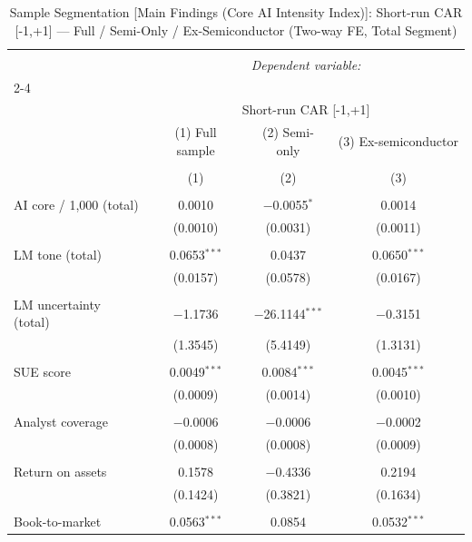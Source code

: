 
\begin{table}[!htbp] \centering 
  \caption{Sample Segmentation [Main Findings (Core AI Intensity Index)]: Short-run CAR [-1,+1] — Full / Semi-Only / Ex-Semiconductor (Two-way FE, Total Segment)} 
  \label{} 
\begin{tabular}{@{\extracolsep{5pt}}lccc} 
\\[-1.8ex]\hline 
\hline \\[-1.8ex] 
 & \multicolumn{3}{c}{\textit{Dependent variable:}} \\ 
\cline{2-4} 
\\[-1.8ex] & \multicolumn{3}{c}{Short-run CAR [-1,+1]} \\ 
 & (1) Full sample & (2) Semi-only & (3) Ex-semiconductor \\ 
\\[-1.8ex] & (1) & (2) & (3)\\ 
\hline \\[-1.8ex] 
 AI core / 1,000 (total) & 0.0010 & $-$0.0055$^{*}$ & 0.0014 \\ 
  & (0.0010) & (0.0031) & (0.0011) \\ 
  & & & \\ 
 LM tone (total) & 0.0653$^{***}$ & 0.0437 & 0.0650$^{***}$ \\ 
  & (0.0157) & (0.0578) & (0.0167) \\ 
  & & & \\ 
 LM uncertainty (total) & $-$1.1736 & $-$26.1144$^{***}$ & $-$0.3151 \\ 
  & (1.3545) & (5.4149) & (1.3131) \\ 
  & & & \\ 
 SUE score & 0.0049$^{***}$ & 0.0084$^{***}$ & 0.0045$^{***}$ \\ 
  & (0.0009) & (0.0014) & (0.0010) \\ 
  & & & \\ 
 Analyst coverage & $-$0.0006 & $-$0.0006 & $-$0.0002 \\ 
  & (0.0008) & (0.0008) & (0.0009) \\ 
  & & & \\ 
 Return on assets & 0.1578 & $-$0.4336 & 0.2194 \\ 
  & (0.1424) & (0.3821) & (0.1634) \\ 
  & & & \\ 
 Book-to-market & 0.0563$^{***}$ & 0.0854 & 0.0532$^{***}$ \\ 

\end{tabular}
\end{table}
